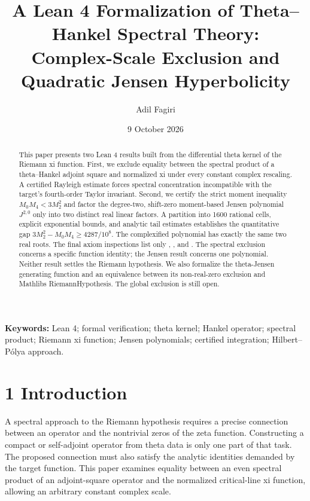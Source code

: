 \documentclass[
  11pt,
]{article}
\title{A Lean 4 Formalization of Theta--Hankel Spectral Theory:\\
Complex-Scale Exclusion and Quadratic Jensen Hyperbolicity}
\author{Adil Fagiri}
\date{9 October 2026}
\begin{document}
\maketitle

\begin{abstract}

This paper presents two Lean 4 results built from the differential theta kernel of the Riemann xi function. First, we exclude equality between the spectral product of a theta--Hankel adjoint square and normalized xi under every constant complex rescaling. A certified Rayleigh estimate forces spectral concentration incompatible with the target's fourth-order Taylor invariant. Second, we certify the strict moment inequality \(M_{0}M_{4} < 3M_{2}^{2}\) and factor the degree-two, shift-zero moment-based Jensen polynomial \(J^{2,0}\) only into two distinct real linear factors. A partition into 1600 rational cells, explicit exponential bounds, and analytic tail estimates establishes the quantitative gap \(3M_{2}^{2} - M_{0}M_{4} \geq 4287/10^{8}\). The complexified polynomial has exactly the same two real roots. The final axiom inspections list only \texttt{}, \texttt{}, and \texttt{}. The spectral exclusion concerns a specific function identity; the Jensen result concerns one polynomial. Neither result settles the Riemann hypothesis. We also formalize the theta-Jensen generating function and an equivalence between its non-real-zero exclusion and Mathlib\textquotesingle s RiemannHypothesis. The global exclusion is still open.

\end{abstract}

\textbf{Keywords:} Lean 4; formal verification; theta kernel; Hankel operator; spectral product; Riemann xi function; Jensen polynomials; certified integration; Hilbert--Pólya approach.

\hypertarget{introduction}{%
\section{1 Introduction}\label{introduction}}

A spectral approach to the Riemann hypothesis requires a precise connection between an operator and the nontrivial zeros of the zeta function. Constructing a compact or self-adjoint operator from theta data is only one part of that task. The proposed connection must also satisfy the analytic identities demanded by the target function. This paper examines equality between an even spectral product of an adjoint-square operator and the normalized critical-line xi function, allowing an arbitrary constant complex scale.
\end{document}

